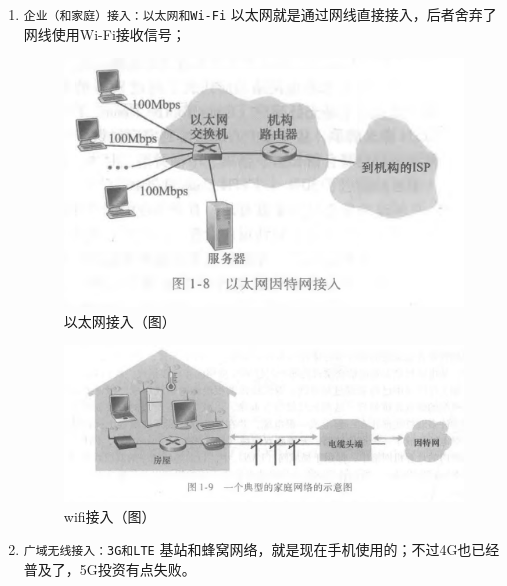 \documentclass[11pt]{article}
\begin{document}
\begin{enumerate}
\item \texttt{企业（和家庭）接入：以太网和Wi-Fi}
以太网就是通过网线直接接入，后者舍弃了网线使用Wi-Fi接收信号；
\begin{figure}[htbp]
\centering
\includegraphics[width=.9\linewidth]{imag/Snipaste_2023-11-20_20-55-20.png}
\caption{以太网接入（图）}
\end{figure}

\begin{figure}[htbp]
\centering
\includegraphics[width=.9\linewidth]{imag/Snipaste_2023-11-20_20-59-20.png}
\caption{wifi接入（图）}
\end{figure}

\item \texttt{广域无线接入：3G和LTE}
基站和蜂窝网络，就是现在手机使用的；不过4G也已经普及了，5G投资有点失败。
\end{enumerate}
\end{document}
